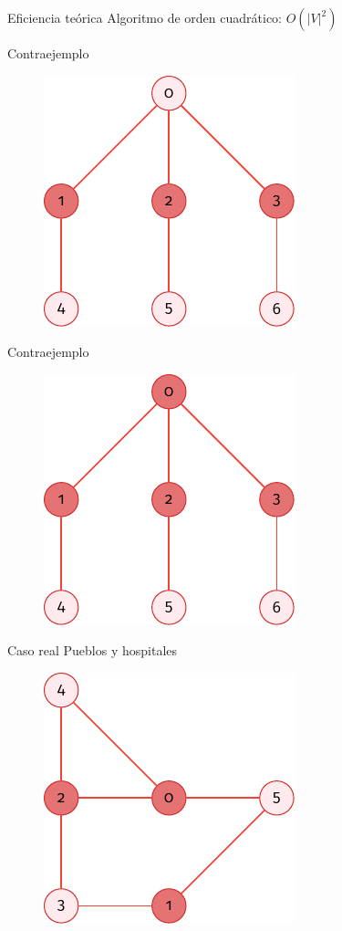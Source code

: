 \documentclass[spanish]{beamer}
\begin{document}
\begin{frame}{Eficiencia teórica}
	Algoritmo de orden cuadrático: $O(|V|^2)$
	

\end{frame}

\begin{frame}{Contraejemplo}

	\begin{figure}[H]
		\centering \includegraphics{./img/grafo2-minimal.pdf}
	\end{figure}
\end{frame}

\begin{frame}{Contraejemplo}

	\begin{figure}[H]
		\centering \includegraphics{./img/grafo2-no-minimal.pdf}
	\end{figure}
\end{frame}

\begin{frame}{Caso real}
	Pueblos y hospitales
	\begin{figure}[H]
		\centering \includegraphics{./img/grafo-ejemplo.pdf}
	\end{figure}
\end{frame}
\end{document}
